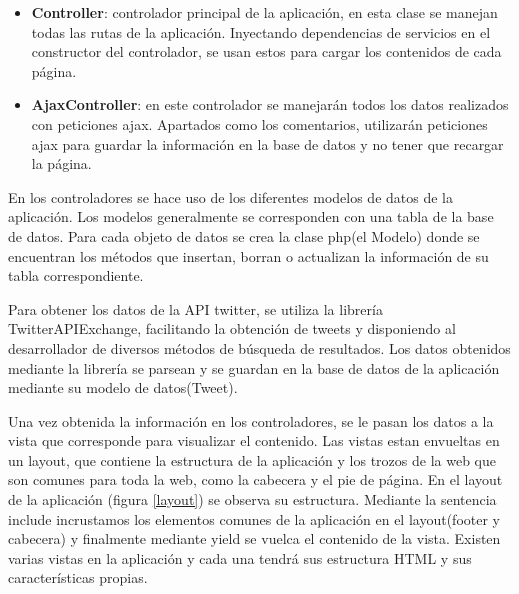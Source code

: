 \begin{itemize}

\item \textbf{Controller}: controlador principal de la aplicación, en esta clase se manejan todas las rutas de la aplicación. Inyectando dependencias de servicios en el constructor del controlador, se usan estos para cargar los contenidos de cada página.

\item \textbf{AjaxController}: en este controlador se manejarán todos los datos realizados con peticiones ajax. Apartados como los comentarios, utilizarán peticiones ajax para guardar la información en la base de datos y no tener que recargar la página.

\end{itemize}


En los controladores se hace uso de los diferentes modelos de datos de la aplicación. Los modelos generalmente se corresponden con una tabla de la base de datos. Para cada objeto de datos se crea la clase php(el Modelo) donde se encuentran los métodos que insertan, borran o actualizan la información de su tabla correspondiente. 

\vspace{5 mm}

Para obtener los datos de la API twitter, se utiliza la librería TwitterAPIExchange, facilitando la obtención de tweets y disponiendo al desarrollador de diversos métodos de búsqueda de resultados. Los datos obtenidos mediante la librería se parsean y se guardan en la base de datos de la aplicación mediante su modelo de datos(Tweet).

\vspace{5 mm}

Una vez obtenida la información en los controladores, se le pasan los datos a la vista que corresponde para visualizar el contenido. Las vistas estan envueltas en un layout, que contiene la estructura de la aplicación y los trozos de la web que son comunes para toda la web, como la cabecera y el pie de página. En el layout de la aplicación (figura \ref{layout}) se observa su estructura. Mediante la sentencia include incrustamos los elementos comunes de la aplicación en el layout(footer y cabecera) y finalmente mediante yield se vuelca el contenido de la vista. Existen varias vistas en la aplicación y cada una tendrá sus estructura HTML y sus características propias.

\vspace{5 mm}


